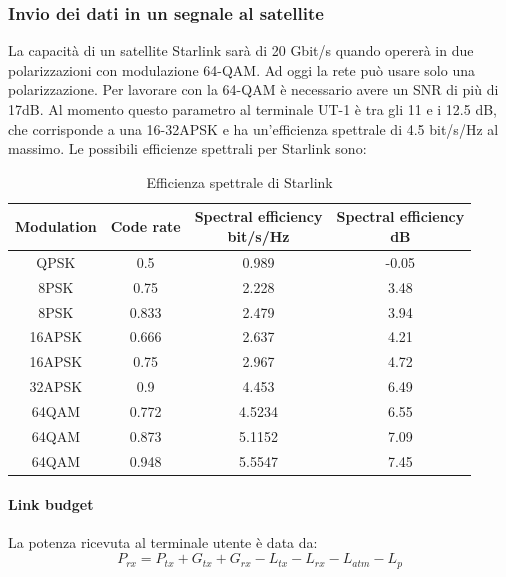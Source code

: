 \subsubsection{Invio dei dati in un segnale al satellite}
La capacità di un satellite Starlink sarà di 20 Gbit/s quando opererà in due polarizzazioni con modulazione 64-\ac{QAM}.
Ad oggi la rete può usare solo una polarizzazione.
Per lavorare con la 64-\ac{QAM} è necessario avere un \ac{SNR} di più di 17dB.
Al momento questo parametro al terminale UT-1 è tra gli 11 e i 12.5 dB, che corrisponde a una 16-32\ac{APSK} e ha un'efficienza spettrale di 4.5 bit/s/Hz al massimo.
Le possibili efficienze spettrali per Starlink sono:

\begin{table}[h]
\centering
\begin{tabular}{|c|c|c|c|}
\hline
\textbf{Modulation} & \textbf{Code rate} & \makecell{\textbf{Spectral efficiency}\\ \textbf{bit/s/Hz}} & \makecell{\textbf{Spectral efficiency} \\ \textbf{dB}}\\ \hline
QPSK     & 0.5   & 0.989  & -0.05 \\ \hline
8PSK     & 0.75  & 2.228  & 3.48  \\ \hline
8PSK     & 0.833 & 2.479  & 3.94  \\ \hline
16APSK   & 0.666 & 2.637  & 4.21  \\ \hline
16APSK   & 0.75  & 2.967  & 4.72  \\ \hline
32APSK   & 0.9   & 4.453  & 6.49  \\ \hline
64QAM    & 0.772 & 4.5234 & 6.55  \\ \hline
64QAM    & 0.873 & 5.1152 & 7.09  \\ \hline
64QAM    & 0.948 & 5.5547 & 7.45  \\ \hline
\end{tabular}
\caption{Efficienza spettrale di Starlink \cite{rozenvasser_estimation_2023}}
\end{table}

\paragraph{Link budget}
La potenza ricevuta al terminale utente è data da:
\begin{equation}
P_{rx} = P_{tx} + G_{tx} + G_{rx} - L_{tx} - L_{rx} - L_{atm} - L_{p}
\label{eq:received-power}
\end{equation}

